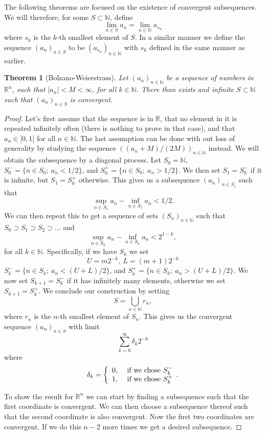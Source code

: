 \documentclass[a4paper,12pt,twoside,BCOR=10mm]{scrbook}
\newtheorem{theorem}{Theorem}[section]
\theoremstyle{definition}
\theoremstyle{definition}
\theoremstyle{definition}
\begin{document}
The following theorems are focused on the existence of convergent subsequences.
We will therefore, for some $S \subset \mathbb{N}$, define
\[
	\lim_{n \in S} a_n = \lim_{n \in \mathbb{N}} a_{s_n}
\]
where $s_k$ is the $k$-th smallest element of $S$.
In a similar manner we define the sequence $(a_n)_{n \in S}$ to be $(a_{s_n})_{n \in \mathbb{N}}$ with $s_k$ defined in the same manner as earlier.
\begin{theorem}[Bolzano-Weierstrass]
Let $(a_n)_{n \in \mathbb{N}}$ be a sequence of numbers in $\mathbb{R}^n$, such that $|a_n| < M < \infty$, for all $k \in \mathbb{N}$.
There than exists and infinite $S \subset \mathbb{N}$ such that $(a_n)_{n \in S}$ is convergent.
\end{theorem}
\begin{proof}
Let's first assume that the sequence is in $\mathbb{R}$,
	that no element in it is repeated infinitely often (there is nothing to prove in that case),
	and that $a_n \in ]0, 1[$ for all $n \in \mathbb{N}$.
The last assumption can be done with out loss of generality by studying the sequence $((a_n + M)/(2M))_{n \in \mathbb{N}}$ instead.
We will obtain the subsequence by a diagonal process.
Let $S_0 = \mathbb{N}$, $S_0^- = \{n \in S_0;\ a_n < 1/2\}$, and $S_0^+ = \{n \in S_0;\ a_n > 1/2\}$.
We then set $S_1 = S_0^-$ if it is infinite, but $S_1 = S_0^+$ otherwise.
This gives us a subsequence $(a_n)_{n \in S_1}$ such that
\[
	\sup_{n \in S_1} a_n - \inf_{n \in S_1} a_n < 1/2.
\]
We can then repeat this to get a sequence of sets $(S_n)_{n \in \mathbb{N}}$ such that $S_0 \supset S_1 \supset S_2 \supset...$ and 
\[
	\sup_{n \in S_k} a_n - \inf_{n \in S_k} a_n < 2^{1 - k},
\]
for all $k \in \mathbb{N}$.
Specifically, if we have $S_k$ we set
\[
	U = m2^{-k},\ 
	L = (m + 1)2^{-k}
\]
$S_k^- = \{n \in S_k;\ a_n < (U + L)/2\}$, and $S_k^+ = \{n \in S_k;\ a_n > (U + L)/2\}$.
We now set $S_{k + 1} = S_k^-$ if it has infinitely many elements, otherwise we set $S_{k + 1} = S_k^+$.
We conclude our construction by setting
\[
	S = \bigcup_{n \in \mathbb{N}} r_n,
\]
where $r_n$ is the $n$-th smallest element of $S_n$.
This gives us the convergent sequence $(a_n)_{n \in S}$ with limit
\[
	\sum_{k = 0}^{\infty} \delta_k 2^{-k}
\]
where
\[
	\delta_k = \left \{
	\begin{array}{c c}
		0,\ & \text{if we chose } S_k^- \\
		1,\ & \text{if we chose } S_k^+
	\end{array}.
	\right .
\]

To show the result for $\mathbb{R}^n$ we can start by finding a subsequence such that the first coordinate is convergent.
We can then choose a subsequence thereof such that the second coordinate is also convergent.
Now the first two coordinates are convergent.
If we do this $n - 2$ more times we get a desired subsequence.
\end{proof}
\end{document}
